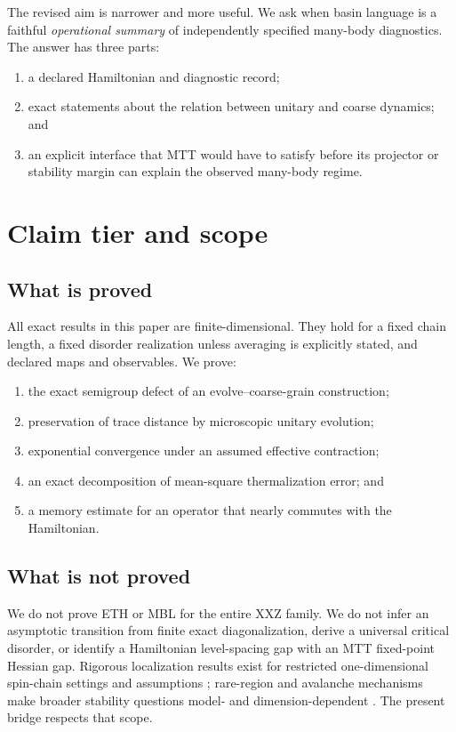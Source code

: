 \documentclass[11pt]{article}
\begin{document}
The revised aim is narrower and more useful.  We ask when basin language
is a faithful \emph{operational summary} of independently specified
many-body diagnostics.  The answer has three parts:
\begin{enumerate}
\item a declared Hamiltonian and diagnostic record;
\item exact statements about the relation between unitary and coarse
dynamics; and
\item an explicit interface that MTT would have to satisfy before its
projector or stability margin can explain the observed many-body regime.
\end{enumerate}

\section{Claim tier and scope}

\subsection{What is proved}

All exact results in this paper are finite-dimensional.  They hold for a
fixed chain length, a fixed disorder realization unless averaging is
explicitly stated, and declared maps and observables.  We prove:
\begin{enumerate}
\item the exact semigroup defect of an evolve--coarse-grain construction;
\item preservation of trace distance by microscopic unitary evolution;
\item exponential convergence under an assumed effective contraction;
\item an exact decomposition of mean-square thermalization error; and
\item a memory estimate for an operator that nearly commutes with the
Hamiltonian.
\end{enumerate}

\subsection{What is not proved}

We do not prove ETH or MBL for the entire XXZ family.  We do not infer an
asymptotic transition from finite exact diagonalization, derive a
universal critical disorder, or identify a Hamiltonian level-spacing gap
with an MTT fixed-point Hessian gap.  Rigorous localization results exist
for restricted one-dimensional spin-chain settings and assumptions
\cite{imbrie2016}; rare-region and avalanche mechanisms make broader
stability questions model- and dimension-dependent
\cite{deroeck2017,morningstar2022}.  The present bridge respects that
scope.
\end{document}
